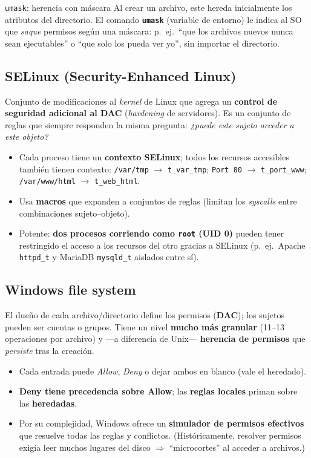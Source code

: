 \documentclass[11pt,a4paper]{article}
\begin{document}
\begin{practbox}{\texttt{umask}: herencia con máscara}
Al crear un archivo, este hereda inicialmente los atributos del directorio. El comando
\textbf{\texttt{umask}} (variable de entorno) le indica al SO que \emph{saque} permisos según
una máscara: p.\ ej.\ ``que los archivos nuevos nunca sean ejecutables'' o ``que solo los pueda
ver yo'', sin importar el directorio.
\end{practbox}

\subsection{SELinux (Security-Enhanced Linux)}
Conjunto de modificaciones al \emph{kernel} de Linux que agrega un \textbf{control de seguridad
adicional al DAC} (\emph{hardening} de servidores). Es un conjunto de reglas que siempre
responden la misma pregunta: \emph{¿puede este sujeto acceder a este objeto?}
\begin{itemize}[leftmargin=1.4em,itemsep=1pt]
  \item Cada proceso tiene un \textbf{contexto SELinux}; todos los recursos accesibles también
        tienen contexto: \texttt{/var/tmp} $\to$ \texttt{t\_var\_tmp};
        \texttt{Port 80} $\to$ \texttt{t\_port\_www};
        \texttt{/var/www/html} $\to$ \texttt{t\_web\_html}.
  \item Usa \textbf{macros} que expanden a conjuntos de reglas (limitan los \emph{syscalls}
        entre combinaciones sujeto–objeto).
  \item Potente: \textbf{dos procesos corriendo como \texttt{root} (UID 0)} pueden tener
        restringido el acceso a los recursos del otro gracias a SELinux (p.\ ej.\ Apache
        \texttt{httpd\_t} y MariaDB \texttt{mysqld\_t} aislados entre sí).
\end{itemize}

\subsection{Windows file system}
El dueño de cada archivo/directorio define los permisos (\textbf{DAC}); los sujetos pueden ser
cuentas o grupos. Tiene un nivel \textbf{mucho más granular} (11--13 operaciones por archivo) y
—a diferencia de Unix— \textbf{herencia de permisos} que \emph{persiste} tras la creación.
\begin{itemize}[leftmargin=1.4em,itemsep=1pt]
  \item Cada entrada puede \emph{Allow}, \emph{Deny} o dejar ambos en blanco (vale el heredado).
  \item \textbf{Deny tiene precedencia sobre Allow}; las \textbf{reglas locales} priman sobre
        las \textbf{heredadas}.
  \item Por su complejidad, Windows ofrece un \textbf{simulador de permisos efectivos} que
        resuelve todas las reglas y conflictos. (Históricamente, resolver permisos exigía leer
        muchos lugares del disco $\Rightarrow$ ``microcortes'' al acceder a archivos.)
\end{itemize}
\end{document}
